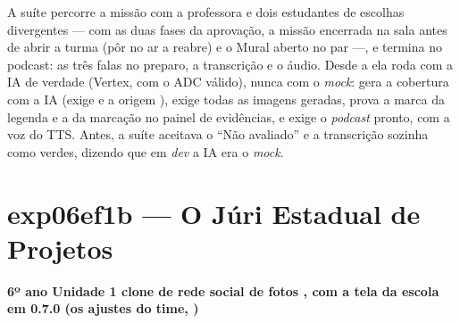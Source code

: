 A suíte  percorre a missão com a
professora e dois estudantes de escolhas divergentes --- com as duas fases da
aprovação, a missão encerrada na sala antes de abrir a turma (pôr no ar a
reabre) e o Mural aberto no par ---, e termina no podcast: as
três falas no preparo, a transcrição e o áudio. Desde a  ela
roda com a IA de verdade (Vertex, com o ADC válido), nunca com o \emph{mock}:
gera a cobertura com a IA (exige  e a origem ), exige todas
as imagens geradas, prova a marca da legenda e a da marcação no painel de
evidências, e exige o \emph{podcast} pronto, com a voz do TTS. Antes, a suíte aceitava o
\enquote{Não avaliado} e a transcrição sozinha como verdes, dizendo que em
\emph{dev} a IA era o \emph{mock}.

\section{exp06ef1b --- O Júri Estadual de Projetos}
\label{sec:exp06ef1b}

\textbf{6º ano \textperiodcentered{} Unidade 1 \textperiodcentered{} clone de
rede social de fotos \textperiodcentered{} , com a tela da escola
em  \textperiodcentered{} 0.7.0 (os ajustes do time, )}

